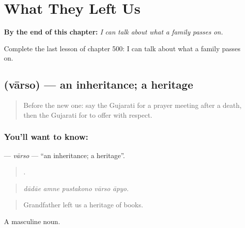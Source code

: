 
\chapter{What They Left Us}
\label{ch:gu-what-they-left-us}

\begin{chapteropening}
\textbf{By the end of this chapter:} \emph{I can talk about what a family passes on.}

Complete the last lesson of chapter 500: I can talk about what a family passes on.
\end{chapteropening}

\section[\texorpdfstring{\gu{વારસો} (vārso)}{વારસો (vārso)}]{ (vārso) — an inheritance; a heritage}

\label{lesson:GU-C500-varso}



\begin{quote}
Before the new one: say the Gujarati for a prayer meeting after a death, then the Gujarati for to offer with respect.
\end{quote}

\subsection*{You'll want to know: }
\textbf{} — \emph{vārso} — \textquotedblleft{}an inheritance; a heritage\textquotedblright{}.

\begin{quote}
    .
\end{quote}

\begin{quote}
\emph{dādāe amne pustakono vārso āpyo.}
\end{quote}

\begin{quote}
Grandfather left us a heritage of books.
\end{quote}

A masculine noun.

